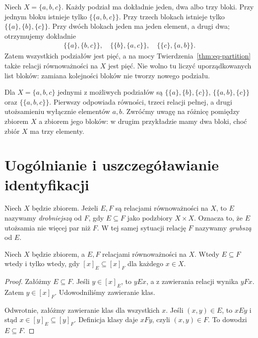 \begin{przyklad}
\label{ex:eq-partitions-three-xliii}
Niech $X=\{a,b,c\}$. Każdy podział ma dokładnie jeden,
dwa albo trzy bloki. Przy jednym bloku istnieje tylko
$\{\{a,b,c\}\}$. Przy trzech blokach istnieje tylko
$\{\{a\},\{b\},\{c\}\}$. Przy dwóch blokach jeden ma
jeden element, a drugi dwa; otrzymujemy dokładnie
\begin{gather*}\{\{a\},\{b,c\}\},\quad \{\{b\},\{a,c\}\},\quad\{\{c\},\{a,b\}\}.\end{gather*}
Zatem wszystkich podziałów jest pięć, a na mocy
Twierdzenia~\ref{thm:eq-partition} także relacji
równoważności na $X$ jest pięć. Nie wolno tu liczyć
uporządkowanych list bloków: zamiana kolejności bloków
nie tworzy nowego podziału.
\end{przyklad}



\begin{przyklad}
Dla $X=\{a,b,c\}$ jednymi z możliwych podziałów są
$\{\{a\},\{b\},\{c\}\}$,
$\{\{a,b\},\{c\}\}$ oraz $\{\{a,b,c\}\}$.
Pierwszy odpowiada równości, trzeci relacji pełnej,
a drugi utożsamieniu wyłącznie elementów $a,b$.
Zwróćmy uwagę na różnicę pomiędzy zbiorem $X$ a
zbiorem jego bloków: w drugim przykładzie mamy dwa
bloki, choć zbiór $X$ ma trzy elementy.
\end{przyklad}

\section{Uogólnianie i uszczegóławianie identyfikacji}\label{sec:eq-refinement}
\begin{definicja}
Niech $X$ będzie zbiorem. Jeżeli $E,F$ są relacjami
równoważności na $X$, to $E$ nazywamy \emph{drobniejszą} od $F$,
gdy $E\subseteq F$ jako podzbiory $X\times X$.
Oznacza to, że $E$ utożsamia nie więcej par niż $F$.
W tej samej sytuacji relację $F$ nazywamy \emph{grubszą}
od $E$.
\end{definicja}

\begin{twierdzenie}
\label{thm:eq-refinement}
Niech $X$ będzie zbiorem, a $E,F$ relacjami
równoważności na $X$. Wtedy $E\subseteq F$ wtedy i tylko wtedy,
gdy $[x]_E\subseteq[x]_F$ dla każdego $x\in X$.
\end{twierdzenie}
\begin{proof}
Załóżmy $E\subseteq F$. Jeśli $y\in[x]_E$, to $yEx$,
a z zawierania relacji wynika $yFx$. Zatem
$y\in[x]_F$. Udowodniliśmy zawieranie klas.

Odwrotnie, załóżmy zawieranie klas dla wszystkich $x$.
Jeśli $(x,y)\in E$, to $xEy$ i stąd
$x\in[y]_E\subseteq[y]_F$. Definicja klasy daje $xFy$,
czyli $(x,y)\in F$. To dowodzi $E\subseteq F$.
\end{proof}

